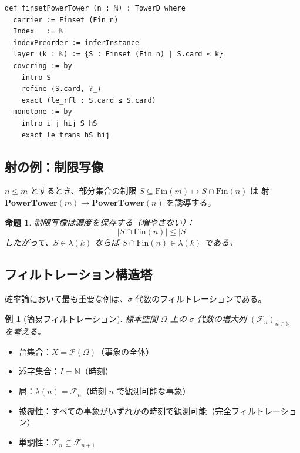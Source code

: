 \documentclass[a4paper,12pt]{ltjsarticle}
\newtheorem{proposition}[theorem]{命題}
\newtheorem{example}[theorem]{例}
\newcommand{\N}{\mathbb{N}}
\begin{document}
\begin{verbatim}
def finsetPowerTower (n : ℕ) : TowerD where
  carrier := Finset (Fin n)
  Index   := ℕ
  indexPreorder := inferInstance
  layer (k : ℕ) := {S : Finset (Fin n) | S.card ≤ k}
  covering := by
    intro S
    refine ⟨S.card, ?_⟩
    exact (le_rfl : S.card ≤ S.card)
  monotone := by
    intro i j hij S hS
    exact le_trans hS hij
\end{verbatim}

\subsection{射の例：制限写像}

$n \leq m$ とするとき、部分集合の制限 $S \subseteq \text{Fin}(m) \mapsto S \cap \text{Fin}(n)$ は
射 $\mathbf{PowerTower}(m) \to \mathbf{PowerTower}(n)$ を誘導する。

\begin{proposition}
制限写像は濃度を保存する（増やさない）：
\begin{equation*}
|S \cap \text{Fin}(n)| \leq |S|
\end{equation*}
したがって、$S \in \lambda(k)$ ならば $S \cap \text{Fin}(n) \in \lambda(k)$ である。
\end{proposition}

\subsection{フィルトレーション構造塔}

確率論において最も重要な例は、$\sigma$-代数のフィルトレーションである。

\begin{example}[簡易フィルトレーション]
\label{ex:filtration}
標本空間 $\Omega$ 上の $\sigma$-代数の増大列 $(\mathcal{F}_n)_{n \in \N}$ を考える。
\end{example}

\begin{itemize}
  \item 台集合：$X = \mathcal{P}(\Omega)$（事象の全体）
  \item 添字集合：$I = \N$（時刻）
  \item 層：$\lambda(n) = \mathcal{F}_n$（時刻 $n$ で観測可能な事象）
  \item 被覆性：すべての事象がいずれかの時刻で観測可能（完全フィルトレーション）
  \item 単調性：$\mathcal{F}_n \subseteq \mathcal{F}_{n+1}$
\end{itemize}
\end{document}
